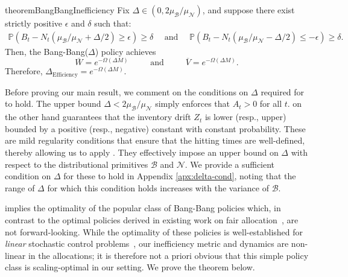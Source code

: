 \documentclass[mnsc,nonblindrev]{informs3}
\newcommand{\pr}{\mathbb{P}}
\renewcommand{\Pr}{\pr}
\newcommand{\NDist}{\mathcal{N}}
\newcommand{\BDist}{\mathcal{B}}
\newcommand{\Nmean}{\mu_{\NDist}}
\newcommand{\Bmean}{\mu_{\BDist}}
\newcommand{\ALG}{{Bang-Bang}\xspace}
\newcommand{\Deff}{\Delta_{\text{Efficiency}}\xspace}
\begin{document}
\begin{restatable}{theorem}{BangBangInefficiency} 
\label{thm:bang-bang_inefficiency_bound}
    Fix $\Delta \in (0, 2\Bmean/\Nmean)$, and suppose there exist strictly positive $\epsilon$ and $\delta$ such that:
    \begin{align}\label{eq:thm-cond}
    \Pr(B_t - N_t(\Bmean / \Nmean + \Delta / 2) \geq \epsilon) \geq \delta \quad \text{ and } \quad \Pr(B_t - N_t(\Bmean / \Nmean - \Delta / 2) \leq - \epsilon) \geq \delta.
    \end{align}
    {Then, the} \ALG($\Delta$) policy achieves
    $$\overline{W} = e^{-\Omega(\Delta M)} \;\;\;\;\;\;\;\; \text{ and }\;\;\;\;\;\;\;\; \overline{V} =e^{-\Omega(\Delta M)}.$$
    Therefore, $\Deff = e^{-\Omega(\Delta M)}$.
\end{restatable}

Before proving our main result, we comment on the conditions on $\Delta$ required for  to hold. The upper bound $\Delta < 2\Bmean/\Nmean$ simply enforces that $A_t > 0$ for all $t$.  on the other hand guarantees that the inventory drift $Z_t$ is lower (resp., upper) bounded by a positive (resp., negative) constant with constant probability. These are mild regularity conditions that ensure that the hitting times are well-defined, thereby allowing us to apply . They effectively impose an upper bound on $\Delta$ with respect to the distributional primitives $\BDist$ and $\NDist$. We provide a sufficient condition on $\Delta$ for these to hold in Appendix \ref{apx:delta-cond}, noting that the range of $\Delta$ for which this condition holds increases with the variance of $\BDist$.


 implies the optimality of the popular class of Bang-Bang policies which, in contrast to the optimal policies derived in existing work on fair allocation~\citep{sinclair2021sequential,banerjee2024online}, are not forward-looking. While the optimality of these policies is well-established for {\it linear} stochastic control problems~\citep{scokaert2002constrained,cerf1995bang}, our inefficiency metric and dynamics are non-linear in the allocations; it is therefore not a priori obvious that this simple policy class is scaling-optimal in our setting. We prove the theorem below.
\end{document}

